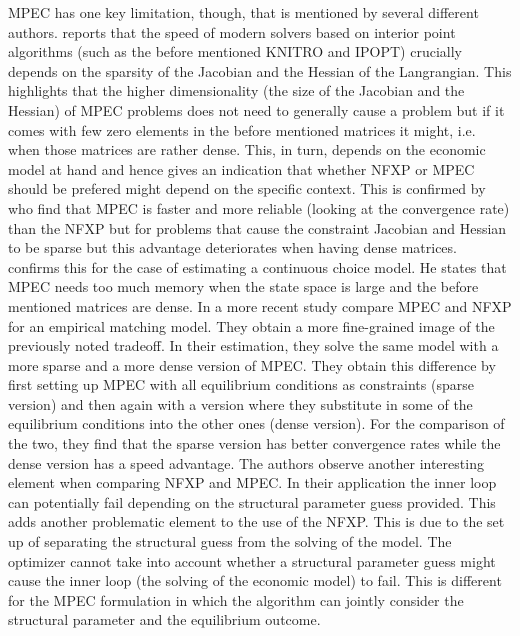 MPEC has one key limitation, though, that is mentioned by several different authors. \cite{Wright.2004} reports that the speed of modern solvers based on interior point algorithms (such as the before mentioned KNITRO and IPOPT) crucially depends on the sparsity of the Jacobian and the Hessian of the Langrangian. This highlights that the higher dimensionality (the size of the Jacobian and the Hessian) of MPEC problems does not need to generally cause a problem but if it comes with few zero elements in the before mentioned matrices it might, i.e. when those matrices are rather dense. This, in turn, depends on the economic model at hand and hence gives an indication that whether NFXP or MPEC should be prefered might depend on the specific context. This is confirmed by \citeauthor{Dube.Fox.Su.2012} who find that MPEC is faster and more reliable (looking at the convergence rate) than the NFXP but for problems that cause the constraint Jacobian and Hessian to be sparse but this advantage deteriorates when having dense matrices. \cite{Jorgensen.2013} confirms this for the case of estimating a continuous choice model. He states that MPEC needs too much memory when the state space is large and the before mentioned matrices are dense. In a more recent study \cite{Dong.Hsieh.Zhang.2017} compare MPEC and NFXP for an empirical matching model. They obtain a more fine-grained image of the previously noted tradeoff. In their estimation, they solve the same model with a more sparse and a more dense version of MPEC. They obtain this difference by first setting up MPEC with all equilibrium conditions as constraints (sparse version) and then again with a version where they substitute in some of the equilibrium conditions into the other ones (dense version). For the comparison of the two, they find that the sparse version has better convergence rates while the dense version has a speed advantage. The authors observe another interesting element when comparing NFXP and MPEC. In their application the inner loop can potentially fail depending on the structural parameter guess provided. This adds another problematic element to the use of the NFXP. This is due to the set up of separating the structural guess from the solving of the model. The optimizer cannot take into account whether a structural parameter guess might cause the inner loop (the solving of the economic model) to fail. This is different for the MPEC formulation in which the algorithm can jointly consider the structural parameter and the equilibrium outcome.



